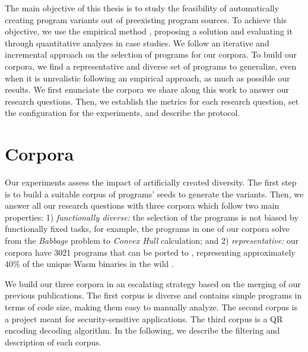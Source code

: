 The main objective of this thesis is to study the feasibility of automatically creating program variants out of preexisting program sources. To achieve this objective,
we use the empirical method \cite{Runeson2020}, proposing a solution and evaluating it through quantitative analyzes in case studies. We follow an iterative and incremental approach on the selection of programs for our corpora. To build our corpora, we find a representative and diverse set of programs to generalize, even when it is unrealistic following an empirical approach, as much as possible our results.
We first enunciate the corpora we share along this work to answer our research questions. Then, we establish the metrics for each research question, set the configuration for the experiments, and describe the protocol.



\section*{Corpora}
\label{section:crow:corpora}

Our experiments assess the impact of artificially created diversity. The first step is to build a suitable corpus of programs' seeds to generate the variants. Then, we answer all our research questions with three corpora which follow two main properties: 1) \emph{functionally diverse:} the selection of the programs is not biased by functionally fixed tasks, for example, the programs in one of our corpora solve from the \textit{Babbage} problem to \textit{Convex Hull} calculation; and 2) \emph{representative:} our corpora have 3021 programs that can be ported to \wasm, representing approximately 40\% of the unique Wasm binaries in the wild \cite{Hilbig2021AnES}.


We build our three corpora in an escalating strategy based on the merging of our previous publications. The first corpus is diverse and contains simple programs in terms of code size, making them easy to manually analyze. The second corpus is a project meant for security-sensitive applications. The third corpus is a QR encoding decoding algorithm. 
In the following, we describe the filtering and description of each corpus.

